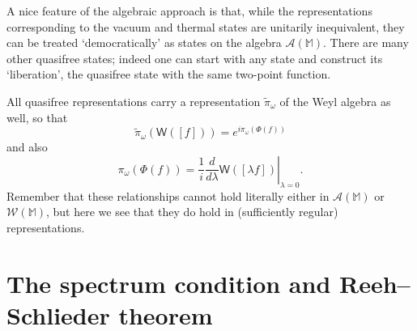 \documentclass[12pt]{article}
\newcommand{\1}{\mathds{1}}                         %
\newcommand{\MM}{\mathbb{M}}
\newcommand{\Ac}{{\mathcal{A}}}
\newcommand{\Wc}{{\mathcal{W}}}
\newcommand{\Ws}{{\mathsf{W}}}
\begin{document}
A nice feature of the algebraic approach is that, while the representations corresponding to the vacuum and thermal states are unitarily inequivalent, they can be treated `democratically' as states on the algebra $\Ac(\MM)$. There are many other quasifree states; indeed one can start with any state and construct its `liberation', the quasifree state with the same two-point function.

All quasifree representations carry a representation $\tilde{\pi}_\omega$ of the Weyl algebra as well, 
so that
\[
\tilde{\pi}_\omega(\Ws([f])) = e^{i\pi_\omega(\Phi(f))}
\]
and also 
\[
\pi_\omega(\Phi(f)) = \left.\frac{1}{i}\frac{d}{d\lambda} \Ws([\lambda f])\right|_{\lambda=0}.
\]
Remember that these relationships cannot hold literally either in $\Ac(\MM)$ or $\Wc(\MM)$, but here we see that they do hold in (sufficiently regular) representations.

\section{The spectrum condition and Reeh--Schlieder theorem} \label{sec:spectrum}
\end{document}
